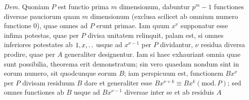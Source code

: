 \emph{Dem.} Quoniam $P$ est functio prima $m$ dimensionum, dabuntur $p^m-1$ functiones diversae pauciorum quam $m$ dimensionum (exclusa scilicet ab omnium numero functione $0$), quae omnes ad $P$ erunt primae. Iam quum $x^\nu$ supponatur esse infima potestas, quae per $P$ divisa unitatem relinquit, palam est, si omnes inferiores potestates ab $1,x,\mathinner{.\,.}$ usque ad $x^{\nu-1}$ per $P$ dividantur, $\nu$ residua diversa prodire, quae per $A$ generaliter designentur. Iam si haec exhauriant omnia quae sunt possibilia, theorema erit demonstratum; sin vero quaedam nondum sint in eorum numero, sit quodcunque eorum $B$; iam perspicuum est, functionem $Bx^\nu$ per $P$ divisam residuum $B$ dare et generaliter esse $Bx^{\nu+k}\equiv Bx^k(\mathrm{mod.}\,P)$; sed omnes functiones ab $B$ usque ad $Bx^{\nu-1}$ diversae inter se et ab residuis $A$

